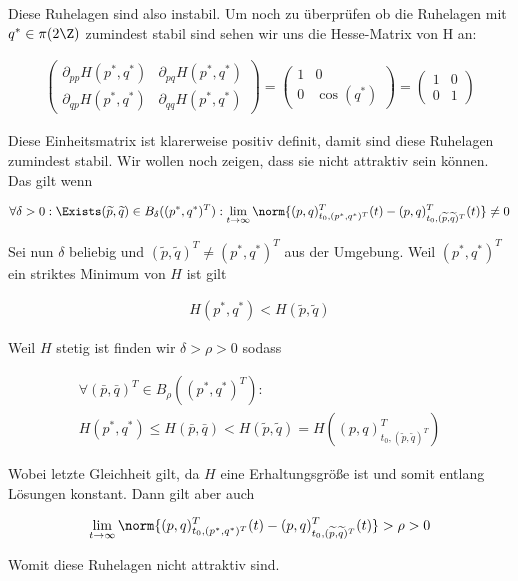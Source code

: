 \begin{solution}
Diese Ruhelagen sind also instabil. Um noch zu überprüfen ob die Ruhelagen mit
$q^* \in \pi(2\Z)$ zumindest stabil sind sehen wir uns die Hesse-Matrix von H an:

\begin{align*}\left(
  \begin{array}{cc}
    \partial_{pp}H(p^*,q^*) & \partial_{pq}H(p^*,q^*) \\
    \partial_{qp}H(p^*,q^*) & \partial_{qq}H(p^*,q^*)
  \end{array}\right)=
  \left(\begin{array}{cc}
    1 & 0 \\
    0 & \cos(q^*)
  \end{array}\right)=
  \left(
  \begin{array}{cc}
    1 & 0 \\
    0 & 1
  \end{array}\right)
\end{align*}

Diese Einheitsmatrix ist klarerweise positiv definit, damit sind diese Ruhelagen zumindest stabil.
Wir wollen noch zeigen, dass sie nicht attraktiv sein können. Das gilt wenn

\begin{align*}
\forall \delta > 0 : \Exists (\widetilde{p},\widetilde{q}) \in B_{\delta}((p^*,q^*)^T):
\lim_{t \rightarrow \infty} \norm{(p,q)^T_{t_0,(p^*,q^*)^T}(t)-(p,q)^T_{t_0,(\widetilde{p},\widetilde{q})^T}(t)} \neq 0
\end{align*}

Sei nun $\delta$ beliebig und $(\widetilde{p},\widetilde{q})^T\neq (p^*,q^*)^T$ aus
der Umgebung. Weil $(p^*,q^*)^T$ ein striktes Minimum von $H$ ist gilt

\begin{align*}
  H(p^*,q^*) < H(\widetilde{p},\widetilde{q})
\end{align*}

Weil $H$ stetig ist finden wir $\delta > \rho >0$ sodass

\begin{align*}
  \forall (\bar{p},\bar{q})^T \in B_{\rho}((p^*,q^*)^T): \\
  H(p^*,q^*) \leq H(\bar{p},\bar{q}) < H(\widetilde{p}, \widetilde{q}) = H((p,q)^T_{t_0,(\widetilde{p},\widetilde{q})^T})
\end{align*}

Wobei letzte Gleichheit gilt, da $H$ eine Erhaltungsgröße ist und somit entlang Lösungen
konstant. Dann gilt aber auch

\begin{align*}
  \lim_{t \rightarrow \infty} \norm{(p,q)^T_{t_0,(p^*,q^*)^T}(t)-(p,q)^T_{t_0,(\widetilde{p},\widetilde{q})^T}(t)}
  > \rho > 0
\end{align*}

Womit diese Ruhelagen nicht attraktiv sind.
\end{solution}
